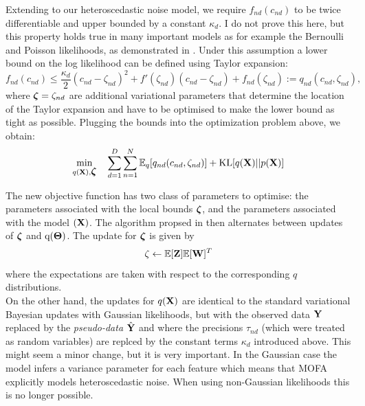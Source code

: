 Extending \cite{Seeger2012} to our heteroscedastic noise model, we require $f_{nd}(c_{nd})$ to be twice differentiable and upper bounded by a constant $\kappa_d$. I do not prove this here, but this property holds true in many important models as for example the Bernoulli and Poisson likelihoods, as demonstrated in \cite{Seeger2012}. Under this assumption a lower bound on the log likelihood can be defined using Taylor expansion:
\begin{equation*}
f_{nd}(c_{nd}) \leq \frac{\kappa_d}{2} (c_{nd} - \zeta_{nd})^2 + f'(\zeta_{nd})(c_{nd} - \zeta_{nd}) + f_{nd}(\zeta_{nd}) := q_{nd}(c_{nd},\zeta_{nd}),
\end{equation*}
where $\mbox{\boldmath $\zeta$} =  \zeta_{nd} $ are additional variational parameters that determine the location of the Taylor expansion and have to be optimised to make the lower bound as tight as possible. Plugging the bounds into the optimization problem above, we obtain:
\begin{equation*}
\min_{q({\bf X}),\mbox{\boldmath $\zeta$}} \quad \sum_{d=1}^{D}\sum_{n=1}^{N} \mathbb{E}_q [ q_{nd}(c_{nd},\zeta_{nd})] + {\rm KL}[q({\bf X})||p({\bf X})]
\end{equation*}

The new objective function has two class of parameters to optimise: the parameters associated with the local bounds $\mbox{\boldmath $\zeta$}$, and the parameters associated with the model $({\bf X})$.
The algorithm propsed in \cite{Seeger2012} then alternates between updates of $\mbox{\boldmath $\zeta$}$ and $\mathrm{q}(\mbox{\boldmath $\Theta$})$. The update for $\mbox{\boldmath $\zeta$}$ is given by
\begin{equation*}
\zeta \leftarrow \mathbb{E}[{\bf Z}]\mathbb{E}[{\bf W}]^{T}
\end{equation*}
where the expectations are taken with respect to the corresponding $q$ distributions.\\
On the other hand, the updates for $q({\bf X})$ are identical to the standard variational Bayesian updates with Gaussian likelihoods, but with the observed data ${\bf Y}$ replaced by the \textit{pseudo-data} $\hat{{\bf Y}}$ and where the precisions $\tau_{nd}$ (which were treated as random variables) are replced by the constant terms $\kappa_d$ introduced above. This might seem a minor change, but it is very important. In the Gaussian case the model infers a variance parameter for each feature which means that MOFA explicitly models heteroscedastic noise. When using non-Gaussian likelihoods this is no longer possible.

